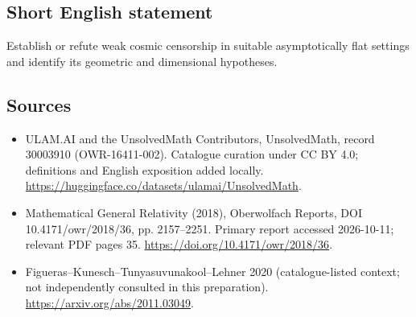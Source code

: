 \documentclass[11pt]{article}
\begin{document}
\subsection{Short English statement}
Establish or refute weak cosmic censorship in suitable asymptotically flat settings and identify its geometric and dimensional hypotheses.
\subsection{Sources}
\begin{itemize}
\item[\hypertarget{source:30003910:1}{S1}] ULAM.AI and the UnsolvedMath Contributors, UnsolvedMath, record 30003910 (OWR-16411-002). Catalogue curation under CC BY 4.0; definitions and English exposition added locally.
\url{https://huggingface.co/datasets/ulamai/UnsolvedMath}.
\item[\hypertarget{source:30003910:2}{S2}] Mathematical General Relativity (2018), Oberwolfach Reports, DOI 10.4171/owr/2018/36, pp. 2157--2251. Primary report accessed 2026-10-11; relevant PDF pages 35.
\url{https://doi.org/10.4171/owr/2018/36}.
\item[\hypertarget{source:30003910:3}{S3}] Figueras--Kunesch--Tunyasuvunakool--Lehner 2020 (catalogue-listed context; not independently consulted in this preparation).
\url{https://arxiv.org/abs/2011.03049}.
\end{itemize}
\label{end:30003910}
\end{document}
